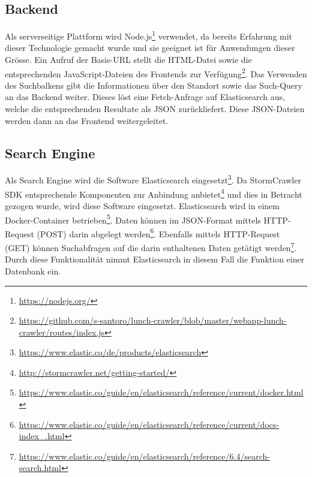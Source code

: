 \subsection{Backend}
Als serverseitige Plattform wird \glqq Node.js\footnote{\url{https://nodejs.org/}}\grqq{} verwendet, da bereits Erfahrung mit dieser Technologie gemacht wurde und sie geeignet ist für Anwendungen dieser Grösse.
Ein Aufruf der Basis-URL stellt die HTML-Datei sowie die entsprechenden JavaScript-Dateien des Frontends zur Verfügung\footnote{\url{https://github.com/s-santoro/lunch-crawler/blob/master/webapp-lunch-crawler/routes/index.js}}.
Das Verwenden des Suchbalkens gibt die Informationen über den Standort sowie das Such-Query an das Backend weiter.
Dieses löst eine Fetch-Anfrage auf Elasticsearch aus, welche die entsprechenden Resultate als JSON zurückliefert.
Diese JSON-Dateien werden dann an das Frontend weitergeleitet.
\subsection{Search Engine}
Als Search Engine wird die Software \glqq Elasticsearch\grqq{} eingesetzt\footnote{\url{https://www.elastic.co/de/products/elasticsearch}}.
Da StormCrawler SDK entsprechende Komponenten zur Anbindung anbietet\footnote{\url{http://stormcrawler.net/getting-started/}} und dies in Betracht gezogen wurde, wird diese Software eingesetzt.
Elasticsearch wird in einem Docker-Container betrieben\footnote{\url{https://www.elastic.co/guide/en/elasticsearch/reference/current/docker.html}}.
Daten können im JSON-Format mittels HTTP-Request (POST) darin abgelegt werden\footnote{\url{https://www.elastic.co/guide/en/elasticsearch/reference/current/docs-index_.html}}.
Ebenfalls mittels HTTP-Request (GET) können Suchabfragen auf die darin enthaltenen Daten getätigt werden\footnote{\url{https://www.elastic.co/guide/en/elasticsearch/reference/6.4/search-search.html}}.
Durch diese Funktionalität nimmt Elasticsearch in diesem Fall die Funktion einer Datenbank ein.
